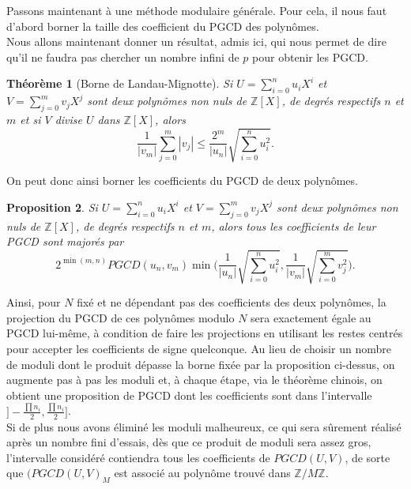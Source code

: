 \documentclass[10pt,a4paper]{report}
\newtheorem{thm}{Théorème}[chapter]
\newtheorem{Prop}[thm]{Proposition}
\begin{document}
Passons maintenant à une méthode modulaire générale. Pour cela, il nous faut d'abord borner la taille des coefficient du PGCD des polynômes.\\

Nous allons maintenant donner un résultat, admis ici, qui nous permet de dire qu'il ne faudra pas chercher un nombre infini de $p$ pour obtenir les PGCD.

\begin{thm}[Borne de Landau-Mignotte]
Si $U= \sum \limits_{i=0}^{n}u_iX^i$ et $V= \sum \limits_{j=0}^{m}v_jX^j$ sont deux polynômes non nuls de $\mathbb{Z}[X]$, de degrés respectifs $n$ et $m$ et si $V$ divise $U$ dans $\mathbb{Z}[X]$, alors
$$     \frac{1}{|v_m|} \sum_{j=0}^m |v_j| \leqslant \frac{2^m}{|u_n|} \sqrt{\sum_{i=0}^n u_i^2} .      $$
\end{thm}

On peut donc ainsi borner les coefficients du PGCD de deux polynômes.

\begin{Prop}
Si $U= \sum \limits_{i=0}^{n}u_iX^i$ et $V= \sum \limits_{j=0}^{m}v_jX^j$ sont deux polynômes non nuls de $\mathbb{Z}[X]$, de degrés respectifs $n$ et $m$, alors tous les coefficients de leur PGCD sont majorés par 
$$    2^{\min (m,n) }  PGCD(u_n  , v_m)  \min  \Big(  \frac{1}{|u_n|} \sqrt{\sum_{i=0}^n u_i^2} ,\frac{1}{|v_m|} \sqrt{\sum_{i=0}^m v_j^2}    \Big)   .         $$
\end{Prop}

Ainsi, pour $N$ fixé et ne dépendant pas des coefficients des deux polynômes, la projection du PGCD de ces polynômes modulo $N$ sera exactement égale au PGCD lui-même, à condition de faire les projections en utilisant les restes centrés pour accepter les coefficients de signe quelconque. Au lieu de choisir un nombre de moduli dont le produit dépasse la borne fixée par la proposition ci-dessus, on augmente pas à pas les moduli et, à chaque étape, via le théorème chinois, on obtient une proposition de PGCD dont les coefficients sont dans l'intervalle $] -\tfrac{\prod n_i}{2}, \tfrac{\prod n_i}{2} ]$. \\

Si de plus nous avons éliminé les moduli malheureux, ce qui sera sûrement réalisé après un nombre fini d'essais, dès que ce produit de moduli sera assez gros, l'intervalle considéré contiendra tous les coefficients de $PGCD(U,V)$, de sorte que $(PGCD(U,V)_M$ est associé au polynôme trouvé dans $\mathbb{Z}/M\mathbb{Z}$.\\
\end{document}
